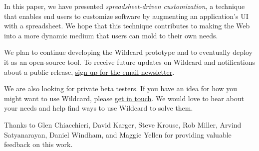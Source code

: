 \documentclass[english,submission]{programming}
\begin{document}
In this paper, we have presented \emph{spreadsheet-driven
customization}, a technique that enables end users to customize software
by augmenting an application's UI with a spreadsheet. We hope that this
technique contributes to making the Web into a more dynamic medium that
users can mold to their own needs.

We plan to continue developing the Wildcard prototype and to eventually
deploy it as an open-source tool. To receive future updates on Wildcard
and notifications about a public release, \href{}{sign up for the email
newsletter}.

We are also looking for private beta testers. If you have an idea for
how you might want to use Wildcard, please
\href{mailto:glitt@mit.edu}{get in touch}. We would love to hear about
your needs and help find ways to use Wildcard to solve them.

\acks
Thanks to Glen Chiacchieri, David Karger, Steve Krouse, Rob Miller, Arvind Satyanarayan, Daniel Windham, and Maggie Yellen for providing valuable feedback on this work.

\printbibliography
\end{document}
